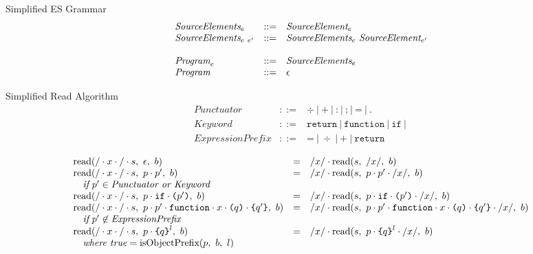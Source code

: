 \documentclass[preprint,10pt]{sigplanconf}
\begin{document}
\begin{displayfigure*}{\label{fig:grammar}Simplified ES Grammar}
\[\begin{array}{lcl}
  \textit{SourceElements}_{e} &::=& \textit{SourceElement}_{e}
  \\
  \textit{SourceElements}_{e~e'} &::=& \textit{SourceElements}_{e}~\textit{SourceElement}_{e'}
  \\ \\
  \textit{Program}_{e} &::=& \textit{SourceElements}_{e}
  \\
  \textit{Program}_{} &::=& \epsilon
\end{array}
\]  
\end{displayfigure*}



\begin{displayfigure*}{\label{fig:simpleread}Simplified Read Algorithm}
\[
\begin{array}{lcl}
  \textit{Punctuator} &::=& \div ~|~ \texttt{+} ~|~ \texttt{:} ~|~
  \texttt{;} ~|~ \texttt{=} ~|~ \texttt{.}
  \\
  \textit{Keyword} &::=& \texttt{return} ~|~ \texttt{function}~|~
  \texttt{if} ~|~ 
  \\
  \textit{ExpressionPrefix} &::=& \texttt{=} ~|~ \div ~|~ \texttt{+}
  ~|~ \texttt{return}
\end{array}
\]
  
\[
  \begin{array}{lcll}
    \textrm{read}(/\cdot x \cdot /\cdot s,~\epsilon,~b)
    &=&
    /x/ \cdot 
      \textrm{read}(s,~/x/,~b)
   
    \\
    \textrm{read}(/\cdot x \cdot /\cdot s,~p \cdot p',~b)
    &=&
    /x/ \cdot 
      \textrm{read}(s,~
        p \cdot p' \cdot /x/
      ,~b)
   
    \\
    \quad\textit{if}~p' \in \textit{Punctuator or Keyword}
    \\
    \textrm{read}(/\cdot x \cdot /\cdot s,~
      p \cdot \texttt{if} \cdot \texttt{(}p'\texttt{)}
    ,~b)
    &=&
    /x/ \cdot 
      \textrm{read}(s,~p \cdot \texttt{if} \cdot \texttt{(}p'\texttt{)} \cdot /x/,~b)
   
    \\
    \textrm{read}(/\cdot x \cdot /\cdot s,~
      p \cdot p' \cdot \texttt{function} \cdot x
      \cdot \texttt{(}q\texttt{)} \cdot \texttt{\{}q'\texttt{\}}
    ,~b)
    &=&
    /x/ \cdot 
      \textrm{read}(s,~
      p \cdot p' 
      \cdot \texttt{function} \cdot x \cdot 
      \texttt{(}q\texttt{)} \cdot \texttt{\{}q'\texttt{\}}\cdot /x/
      ,~b)
    \\
    \quad \textit{if}~p' \not \in \textit{ExpressionPrefix}
    \\
    \textrm{read}(/\cdot x \cdot / \cdot s,~
      p \cdot \texttt{\{}q\texttt{\}}^{l}
    ,~b)
    &=&
    /x/ \cdot 
      \textrm{read}(s,~
        p \cdot \texttt{\{}q\texttt{\}}^{l}\cdot /x/
      ,~b)
   
    \\
    \quad \textit{where true} = \textrm{isObjectPrefix}(p,~b,~l)


\end{array}\]
\end{displayfigure*}
\end{document}

